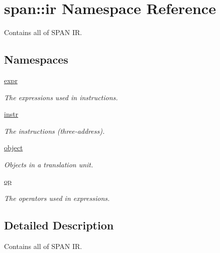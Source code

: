 \hypertarget{namespacespan_1_1ir}{}\section{span\+:\+:ir Namespace Reference}
\label{namespacespan_1_1ir}


Contains all of S\+P\+AN IR.  


\subsection*{Namespaces}
\begin{DoxyCompactItemize}
\item 
 \hyperlink{namespacespan_1_1ir_1_1expr}{expr}
\begin{DoxyCompactList}\small\item\em The expressions used in instructions. \end{DoxyCompactList}\item 
 \hyperlink{namespacespan_1_1ir_1_1instr}{instr}
\begin{DoxyCompactList}\small\item\em The instructions (three-\/address). \end{DoxyCompactList}\item 
 \hyperlink{namespacespan_1_1ir_1_1object}{object}
\begin{DoxyCompactList}\small\item\em Objects in a translation unit. \end{DoxyCompactList}\item 
 \hyperlink{namespacespan_1_1ir_1_1op}{op}
\begin{DoxyCompactList}\small\item\em The operators used in expressions. \end{DoxyCompactList}\end{DoxyCompactItemize}


\subsection{Detailed Description}
Contains all of S\+P\+AN IR. 